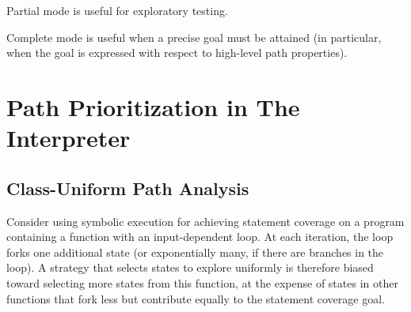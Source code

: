 

Partial mode is useful for exploratory testing.

Complete mode is useful when a precise goal must be attained (in particular, when the goal is expressed with respect to high-level path properties).



\section{Path Prioritization in The Interpreter}





\subsection{Class-Uniform Path Analysis}

Consider using symbolic execution for achieving statement coverage on a program containing a function with an input-dependent loop.  At each iteration, the loop forks one additional state (or exponentially many, if there are branches in the loop). A strategy that selects states to explore uniformly is therefore biased toward selecting more states from this function, at the expense of states in other functions that fork less but contribute equally to the statement coverage goal.

